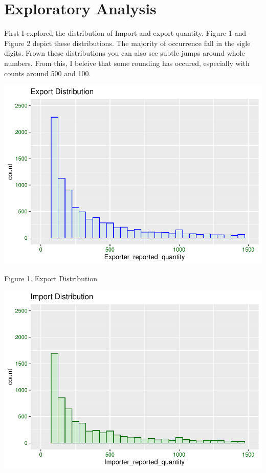 \documentclass[
  12pt,
]{article}
\begin{document}
\hypertarget{exploratory-analysis}{%
\section{Exploratory Analysis}\label{exploratory-analysis}}

First I explored the distribution of Import and export quantity. Figure
1 and Figure 2 depict these distributions. The majority of occurrence
fall in the sigle digits. Frown these distributions you can also see
subtle jumps around whole numbers. From this, I beleive that some
rounding has occured, especially with counts around 500 and 100.

\includegraphics{Wood_ENV872_Project_files/figure-latex/unnamed-chunk-5-1.pdf}

Figure 1. Export Distribution

\includegraphics{Wood_ENV872_Project_files/figure-latex/unnamed-chunk-6-1.pdf}
\end{document}
